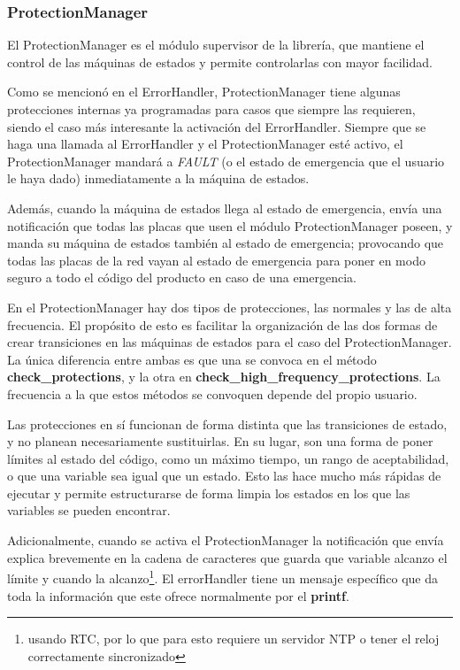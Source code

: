 \documentclass{report}
\begin{document}
\subsubsection{ProtectionManager}
El ProtectionManager es el módulo supervisor de la librería, que mantiene el control de las máquinas de estados y permite controlarlas con mayor facilidad. 
\par \vspace{0.3cm}
Como se mencionó en el ErrorHandler, ProtectionManager tiene algunas protecciones internas ya programadas para casos que siempre las requieren, siendo el caso más interesante la activación del ErrorHandler. Siempre que se haga una llamada al ErrorHandler y el ProtectionManager esté activo, el ProtectionManager mandará a \textit{FAULT} (o el estado de emergencia que el usuario le haya dado) inmediatamente a la máquina de estados. 
\par \vspace{0.3cm}
Además, cuando la máquina de estados llega al estado de emergencia, envía una notificación que todas las placas que usen el módulo ProtectionManager poseen, y manda su máquina de estados también al estado de emergencia; provocando que todas las placas de la red vayan al estado de emergencia para poner en modo seguro a todo el código del producto en caso de una emergencia. 
\par \vspace{0.3cm}
En el ProtectionManager hay dos tipos de protecciones, las normales y las de alta frecuencia. El propósito de esto es facilitar la organización de las dos formas de crear transiciones en las máquinas de estados para el caso del ProtectionManager. La única diferencia entre ambas es que una se convoca en el método \textbf{check\_protections}, y la otra en \textbf{check\_high\_frequency\_protections}. La frecuencia a la que estos métodos se convoquen depende del propio usuario. 
\par \vspace{0.3cm}
Las protecciones en sí funcionan de forma distinta que las transiciones de estado, y no planean necesariamente sustituirlas. En su lugar, son una forma de poner límites al estado del código, como un máximo tiempo, un rango de aceptabilidad, o que una variable sea igual que un estado. Esto las hace mucho más rápidas de ejecutar y permite estructurarse de forma limpia los estados en los que las variables se pueden encontrar. \par 
Adicionalmente, cuando se activa el ProtectionManager la notificación que envía explica brevemente en la cadena de caracteres que guarda que variable alcanzo el límite y cuando la alcanzo\footnote{usando RTC, por lo que para esto requiere un servidor NTP o tener el reloj correctamente sincronizado}. El errorHandler tiene un mensaje específico que da toda la información que este ofrece normalmente por el \textbf{printf}. 
\end{document}
